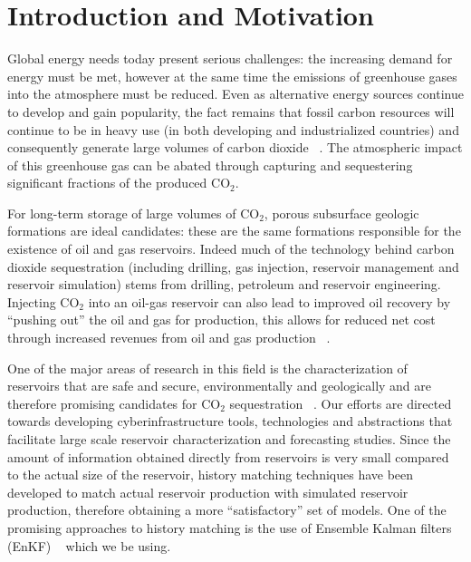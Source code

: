 \documentclass{acm_proc_article-sp}
\begin{document}



\section{Introduction and Motivation}

Global energy needs today present serious challenges: the increasing
demand for energy must be met, however at the same time the emissions
of greenhouse gases into the atmosphere must be reduced. Even as
alternative energy sources continue to develop and gain popularity,
the fact remains that fossil carbon resources will continue to be in
heavy use (in both developing and industrialized countries) and
consequently generate large volumes of carbon dioxide
~\cite{GeoRPT}. The atmospheric impact of this greenhouse gas can be
abated through capturing and sequestering significant fractions of the
produced CO$_2$.

For long-term storage of large volumes of CO$_2$, porous subsurface
geologic formations are ideal candidates: these are the same
formations responsible for the existence of oil and gas
reservoirs. Indeed much of the technology behind carbon dioxide
sequestration (including drilling, gas injection, reservoir management
and reservoir simulation) stems from drilling, petroleum and
reservoir engineering. Injecting CO$_2$ into an oil-gas reservoir can
also lead to improved oil recovery by ``pushing out'' the oil and gas
for production, this allows for reduced net cost through increased
revenues from oil and gas production ~\cite{EORBook}.

One of the major areas of research in this field is the
characterization of reservoirs that are safe and secure,
environmentally and geologically and are therefore promising
candidates for CO$_2$ sequestration ~\cite{GeoRPT,Luigi}. Our efforts
are directed towards developing cyberinfrastructure tools,
technologies and abstractions that facilitate large scale reservoir
characterization and forecasting studies.  Since the amount of
information obtained directly from reservoirs is very small compared
to the actual size of the reservoir, history matching techniques have
been developed to match actual reservoir production with simulated
reservoir production, therefore obtaining a more ``satisfactory'' set
of models. One of the promising approaches to history matching is the
use of Ensemble Kalman filters (EnKF) ~\cite{KalmanPaper, DO2007,
  LiEnKF07, DO2006} which we be using.
\end{document}
